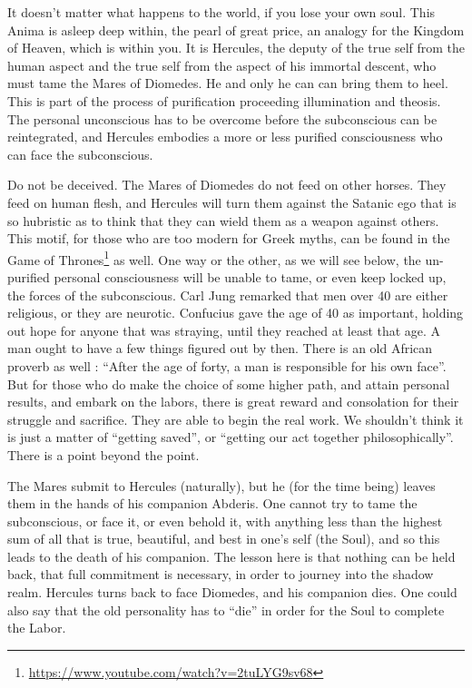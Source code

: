 It doesn't matter what happens to the world, if you lose your own soul. This Anima is asleep deep within, the pearl of great price, an analogy for the Kingdom of Heaven, which is within you. It is Hercules, the deputy of the true self from the human aspect and the true self from the aspect of his immortal descent, who must tame the Mares of Diomedes. He and only he can can bring them to heel. This is part of the process of purification proceeding illumination and theosis. The personal unconscious has to be overcome before the subconscious can be reintegrated, and Hercules embodies a more or less purified consciousness who can face the subconscious.

Do not be deceived. The Mares of Diomedes do not feed on other horses. They feed on human flesh, and Hercules will turn them against the Satanic ego that is so hubristic as to think that they can wield them as a weapon against others. This motif, for those who are too modern for Greek myths, can be found in the Game of Thrones\footnote{\url{https://www.youtube.com/watch?v=2tuLYG9sv68}} as well. One way or the other, as we will see below, the un-purified personal consciousness will be unable to tame, or even keep locked up, the forces of the subconscious. Carl Jung remarked that men over 40 are either religious, or they are neurotic. Confucius gave the age of 40 as important, holding out hope for anyone that was straying, until they reached at least that age. A man ought to have a few things figured out by then. There is an old African proverb as well : ``After the age of forty, a man is responsible for his own face''. But for those who do make the choice of some higher path, and attain personal results, and embark on the labors, there is great reward and consolation for their struggle and sacrifice. They are able to begin the real work. We shouldn't think it is just a matter of ``getting saved'', or ``getting our act together philosophically''. There is a point beyond the point.

The Mares submit to Hercules (naturally), but he (for the time being) leaves them in the hands of his companion Abderis. One cannot try to tame the subconscious, or face it, or even behold it, with anything less than the highest sum of all that is true, beautiful, and best in one's self (the Soul), and so this leads to the death of his companion. The lesson here is that nothing can be held back, that full commitment is necessary, in order to journey into the shadow realm. Hercules turns back to face Diomedes, and his companion dies. One could also say that the old personality has to ``die'' in order for the Soul to complete the Labor.

